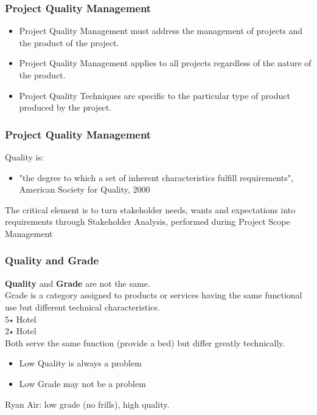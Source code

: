 \begin{frame}
\frametitle{Project Quality Management}
\begin{itemize}
	\item Project Quality Management must address the management of projects and the product of the project.
	\item Project Quality Management applies to all projects regardless of the nature of the product.
	\item Project Quality Techniques are specific to the particular type of product produced by the project.
\end{itemize}
\end{frame}




\begin{frame}
\frametitle{Project Quality Management}

Quality is:
\begin{itemize}
\item "the degree to which a set of inherent characteristics fulfill requirements", American Society for Quality, 2000
\end{itemize}
The critical element is to turn stakeholder needs, wants and expectations into requirements through Stakeholder Analysis, performed during Project Scope Management
\end{frame}




\begin{frame}
\frametitle{Quality and Grade}
\textbf{Quality} and \textbf{Grade} are not the same.  \\
Grade is a category assigned to products or services having the same functional use but different technical characteristics. \\
\hspace{1cm} 5$\star$ Hotel\\
\hspace{1cm} 2$\star$ Hotel\\
Both serve the same function (provide a bed) but differ greatly technically.
\begin{itemize}
	\item Low Quality is always a problem
	\item Low Grade may not be a problem
\end{itemize}
Ryan Air: low grade (no frills), high quality.
\end{frame}




